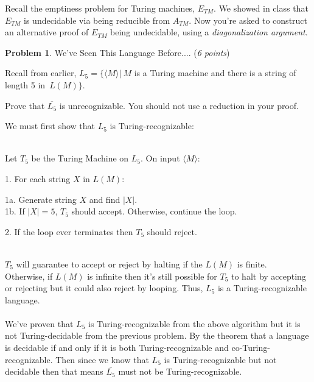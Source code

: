 \documentclass[11pt]{article}
\theoremstyle{definition}
\theoremstyle{theorem}
\newtheorem{prob}{Problem}
\newcommand{\solution}{\medskip\noindent{\color{blue}\textbf{Solution:}}}
\begin{document}
Recall the emptiness problem for Turing machines, $E_{TM}$. We showed in class that  $E_{TM}$ is undecidable via being reducible from $A_{TM}$. Now you're asked to construct an alternative proof of $E_{TM}$ being undecidable, using a \emph{diagonalization argument}. 

\solution






\newpage

\begin{prob} We've Seen This Language Before.... (\emph{6 points})\end{prob}

Recall from earlier, $L_{5} = \{\langle M \rangle | ~M $  is a Turing machine and there is a string of length 5 in~$ L(M)\}$.

Prove that $\overline{L_{5}}$ is unrecognizable. You should not use a reduction in your proof.



\solution

\noindent We must first show that $L_{5}$ is Turing-recognizable: \\~\\
\hspace*{0.9cm}
\begin{minipage}{1.8\textwidth}
Let $T_{5}$ be the Turing Machine on $L_{5}$. On input $\langle M \rangle$: \\
\hspace*{1.2cm}
\begin{minipage}{1.8\textwidth}
\vspace*{0.5cm}
1. For each string $X$ in $L(M)$: \\
	\hspace*{1.7cm}
	\begin{minipage}{0.75\textwidth}
	1a. Generate string $X$ and find $|X|$. \\
	1b. If $|X| = 5$, $T_{5}$ should accept. Otherwise, continue the loop. 
	\vspace*{0.5cm}	
	\end{minipage}

2. If the loop ever terminates then $T_{5}$ should reject.  \\~\\
\end{minipage}
\end{minipage}

\noindent$T_{5}$ will guarantee to accept or reject by halting if the $L(M)$ is finite. \\
Otherwise, if $L(M)$ is infinite then it's still possible for $T_{5}$ to halt by accepting or rejecting but it could also reject by looping. Thus, $L_{5}$ is a Turing-recognizable language. \\~\\
We've proven that $L_{5}$ is Turing-recognizable from the above algorithm but it is not Turing-decidable from the previous problem. By the theorem that a language is decidable if and only if it is both Turing-recognizable and co-Turing-recognizable. Then since we know that $L_{5}$ is Turing-recognizable but not decidable then that means $\overline{L_{5}}$ must not be Turing-recognizable.
\end{document}
